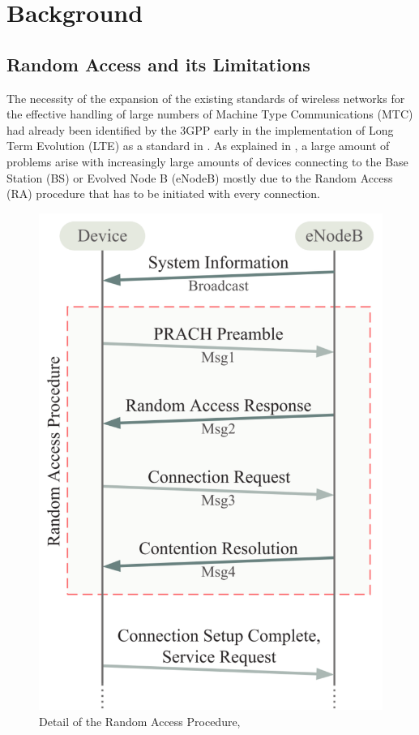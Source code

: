 \chapter{Background}

\section{Random Access and its Limitations}\label{B:RA}
The necessity of the expansion of the existing standards of wireless networks for the effective handling of large numbers of Machine Type Communications (MTC) had already been identified by the 3GPP early in the implementation of Long Term Evolution (LTE) as a standard in \cite{3rdGenerationPartnershipProject;2011}. As explained in \cite{Laya2014}, a large amount of problems arise with increasingly large amounts of devices connecting to the Base Station (BS) or Evolved Node B (eNodeB) mostly due to the Random Access (RA) procedure that has to be initiated with every connection.

\begin{figure}[!h]
\centering
\includegraphics[scale = 0.35]{figures/RACH_LAYA}
\caption{Detail of the Random Access Procedure, \cite{Laya2014}} \label{fig:RACH_LAYA}
\end{figure}

